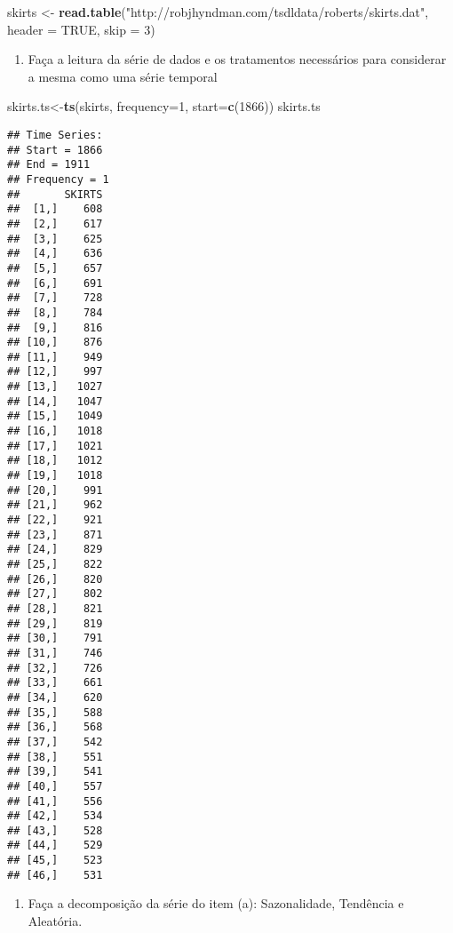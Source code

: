 \documentclass[]{article}
\newenvironment{Shaded}{\begin{snugshade}}{\end{snugshade}}
\newcommand{\KeywordTok}[1]{\textcolor[rgb]{0.13,0.29,0.53}{\textbf{#1}}}
\newcommand{\DataTypeTok}[1]{\textcolor[rgb]{0.13,0.29,0.53}{#1}}
\newcommand{\DecValTok}[1]{\textcolor[rgb]{0.00,0.00,0.81}{#1}}
\newcommand{\StringTok}[1]{\textcolor[rgb]{0.31,0.60,0.02}{#1}}
\newcommand{\OtherTok}[1]{\textcolor[rgb]{0.56,0.35,0.01}{#1}}
\newcommand{\NormalTok}[1]{#1}
\providecommand{\tightlist}{%
  \setlength{\itemsep}{0pt}\setlength{\parskip}{0pt}}
\begin{document}
\begin{Shaded}
\begin{Highlighting}[]
\NormalTok{skirts <-}\StringTok{ }\KeywordTok{read.table}\NormalTok{(}\StringTok{"http://robjhyndman.com/tsdldata/roberts/skirts.dat"}\NormalTok{, }\DataTypeTok{header =} \OtherTok{TRUE}\NormalTok{, }\DataTypeTok{skip =} \DecValTok{3}\NormalTok{) }
\end{Highlighting}
\end{Shaded}

\begin{enumerate}
\def\labelenumi{\alph{enumi})}
\tightlist
\item
  Faça a leitura da série de dados e os tratamentos necessários para
  considerar a mesma como uma série temporal
\end{enumerate}

\begin{Shaded}
\begin{Highlighting}[]
\NormalTok{skirts.ts<-}\KeywordTok{ts}\NormalTok{(skirts, }\DataTypeTok{frequency=}\DecValTok{1}\NormalTok{, }\DataTypeTok{start=}\KeywordTok{c}\NormalTok{(}\DecValTok{1866}\NormalTok{))}
\NormalTok{skirts.ts}
\end{Highlighting}
\end{Shaded}

\begin{verbatim}
## Time Series:
## Start = 1866 
## End = 1911 
## Frequency = 1 
##       SKIRTS
##  [1,]    608
##  [2,]    617
##  [3,]    625
##  [4,]    636
##  [5,]    657
##  [6,]    691
##  [7,]    728
##  [8,]    784
##  [9,]    816
## [10,]    876
## [11,]    949
## [12,]    997
## [13,]   1027
## [14,]   1047
## [15,]   1049
## [16,]   1018
## [17,]   1021
## [18,]   1012
## [19,]   1018
## [20,]    991
## [21,]    962
## [22,]    921
## [23,]    871
## [24,]    829
## [25,]    822
## [26,]    820
## [27,]    802
## [28,]    821
## [29,]    819
## [30,]    791
## [31,]    746
## [32,]    726
## [33,]    661
## [34,]    620
## [35,]    588
## [36,]    568
## [37,]    542
## [38,]    551
## [39,]    541
## [40,]    557
## [41,]    556
## [42,]    534
## [43,]    528
## [44,]    529
## [45,]    523
## [46,]    531
\end{verbatim}

\begin{enumerate}
\def\labelenumi{\alph{enumi})}
\setcounter{enumi}{1}
\tightlist
\item
  Faça a decomposição da série do item (a): Sazonalidade, Tendência e
  Aleatória.
\end{enumerate}
\end{document}
